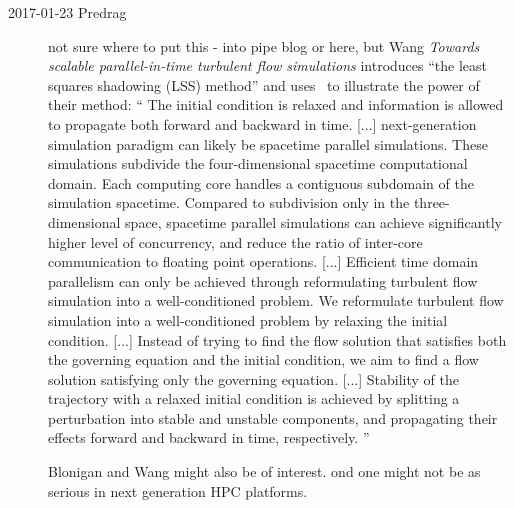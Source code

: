 \begin{description}
\item[2017-01-23 Predrag]
not sure where to put this - into pipe blog or here, but
Wang \etal{}
{\em Towards scalable parallel-in-time turbulent flow simulations}
introduces ``the least squares shadowing (LSS) method'' and
uses \KS\ to illustrate the power of their method: ``
The initial condition is relaxed and information is allowed to propagate
both forward and backward in time. [...]
next-generation simulation paradigm can likely be spacetime parallel
simulations. These simulations subdivide the four-dimensional spacetime
computational domain. Each computing core handles a contiguous subdomain
of the simulation spacetime. Compared to subdivision only in the
three-dimensional space, spacetime parallel simulations can achieve
significantly higher level of concurrency, and reduce the ratio of
inter-core communication to floating point operations. [...]
Efficient time domain parallelism can only be achieved through
reformulating turbulent flow simulation into a well-conditioned problem.
We reformulate turbulent flow simulation into a well-conditioned problem
by relaxing the initial condition.
 [...]
Instead of trying to find the flow solution that satisfies both the
governing equation and the initial condition, we aim to find a flow
solution satisfying only the governing equation.
 [...]
Stability of the trajectory with a relaxed initial condition is achieved
by splitting a perturbation into stable and unstable components, and
propagating their effects forward and backward in time, respectively.
''

Blonigan and Wang might also be of interest.
ond one might not be as serious
in next generation HPC platforms.



\end{description}
